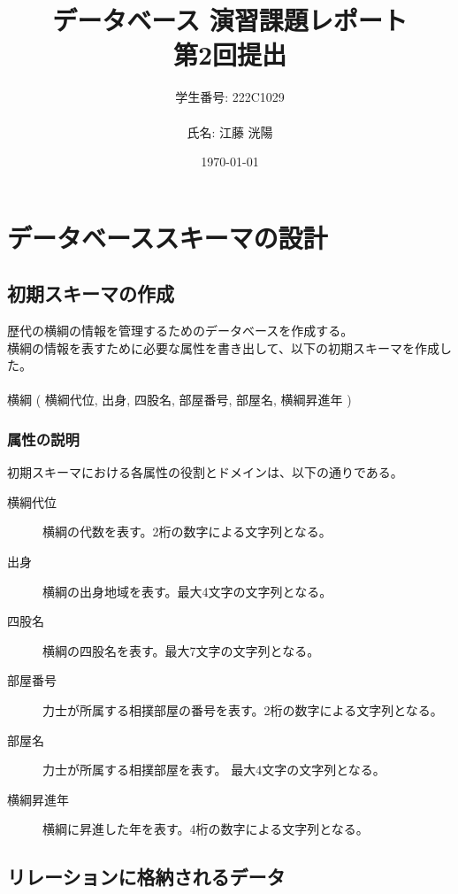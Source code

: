 \documentclass[10pt,a4paper,titlepage]{jreport}
\title{ データベース 演習課題レポート\\第2回提出}
\author{学生番号: 222C1029\\\\氏名: 江藤 洸陽}
\date{\today}
\begin{document}
\maketitle

\chapter{データベーススキーマの設計}

\section{初期スキーマの作成}
歴代の横綱の情報を管理するためのデータベースを作成する。\\
横綱の情報を表すために必要な属性を書き出して、以下の初期スキーマを作成した。\\
\\
横綱 ( 横綱代位, 出身, 四股名, 部屋番号, 部屋名, 横綱昇進年 )

\subsection{属性の説明}

初期スキーマにおける各属性の役割とドメインは、以下の通りである。

\begin{description}

\item[横綱代位]
横綱の代数を表す。2桁の数字による文字列となる。

\item[出身]
横綱の出身地域を表す。最大4文字の文字列となる。

\item[四股名]
横綱の四股名を表す。最大7文字の文字列となる。
  
\item[部屋番号]
力士が所属する相撲部屋の番号を表す。2桁の数字による文字列となる。

\item[部屋名]
力士が所属する相撲部屋を表す。 最大4文字の文字列となる。

\item[横綱昇進年]
横綱に昇進した年を表す。4桁の数字による文字列となる。

\end{description}

\section{リレーションに格納されるデータ}
\end{document}
